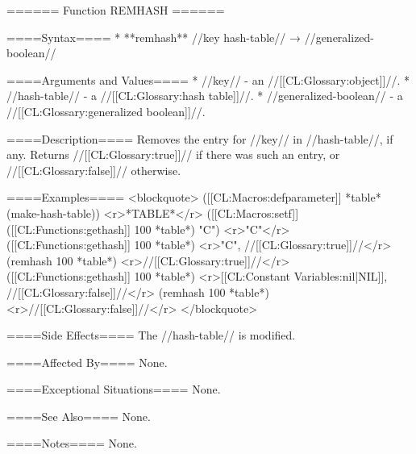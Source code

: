 ====== Function REMHASH ======

====Syntax====
  * **remhash** //key hash-table// → //generalized-boolean//

====Arguments and Values====
  * //key// - an //[[CL:Glossary:object]]//.
  * //hash-table// - a //[[CL:Glossary:hash table]]//.
  * //generalized-boolean// - a //[[CL:Glossary:generalized boolean]]//.

====Description====
Removes the entry for //key// in //hash-table//, if any. Returns //[[CL:Glossary:true]]// if there was such an entry, or //[[CL:Glossary:false]]// otherwise.

====Examples====
<blockquote>
([[CL:Macros:defparameter]] *table* (make-hash-table)) <r>*TABLE*</r>
([[CL:Macros:setf]] ([[CL:Functions:gethash]] 100 *table*) "C") <r>"C"</r>
([[CL:Functions:gethash]] 100 *table*) <r>"C", //[[CL:Glossary:true]]//</r>
(remhash 100 *table*) <r>//[[CL:Glossary:true]]//</r>
([[CL:Functions:gethash]] 100 *table*) <r>[[CL:Constant Variables:nil|NIL]], //[[CL:Glossary:false]]//</r>
(remhash 100 *table*) <r>//[[CL:Glossary:false]]//</r>
</blockquote>

====Side Effects====
The //hash-table// is modified.

====Affected By====
None.

====Exceptional Situations====
None.

====See Also====
None.

====Notes====
None.
